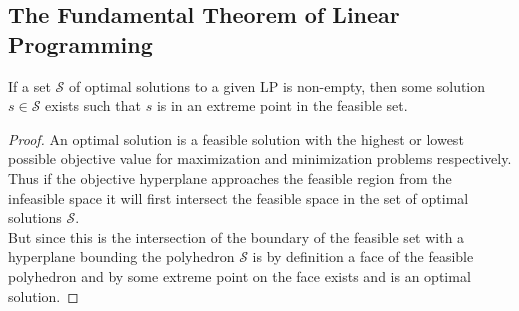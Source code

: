 \subsection{The Fundamental Theorem of Linear Programming}
\begin{theorem}\label{extreme point}
If a set $\mathcal{S}$ of optimal solutions to a given LP is non-empty, then some solution $s\in \mathcal{S}$ exists such that $s$ is in an extreme point in the feasible set.
\begin{proof}
An optimal solution is a feasible solution with the highest or lowest possible objective value for maximization and minimization problems respectively. Thus if the objective hyperplane approaches the feasible region from the infeasible space it will first intersect the feasible space in the set of optimal solutions $\mathcal{S}$.\\
But since this is the intersection of the boundary of the feasible set with a hyperplane bounding the polyhedron $\mathcal{S}$ is by definition a face of the feasible polyhedron and by  some extreme point on the face exists and is an optimal solution. 
\iffalse
Let $A$ be the feasible region to a given Linear problem and let $\textbf{x}_0=\begin{bmatrix}
x_1\\ \vdots\\ x_n
\end{bmatrix}
$ be an optimal solution with value $z(\textbf{x}_0)=\zeta$.
Suppose $\textbf{x}_0$ is not in an extreme point of $A$. Then $\textbf{x}_0$ is either in the open set $A'=A^O$ or on some point of the boundary $\bar{A}-A^O$ that is not an extreme point. In the first case at least one of the coordinates $x_1,\cdots, x_n$ can be increased or decreased until the solution reaches a point $\textbf{x}_1$ on $\bar{A}-A^O$ with $z(\textbf{x}_1)< \text{ or } > \zeta$. Thus that cannot be the case.\\
In the second case there are two options;
\begin{enumerate}
\item The hyperplane defined by $z(\textbf{x}) = \zeta$ intersects one or more of the constraint functions in $\textbf{x}_0$ but is not parallel to any of them.
\item The hyperplane defined by $z(\textbf{x}) = \zeta$ is equal to the entire hyperplane defined by a constraint function or all points of the intersection of several constraint functions are contained within the hyperplane.
\end{enumerate}
In the first case we have a contradiction since we can increase or decrease the values $x_1,\cdots, x_n$ while still remaining in the feasible region and thus find a vector $\textbf{x}_1$ with $z(\textbf{x}_1)< \text{ or } > \zeta$. In the second case the entire subset of the hyperplane contained in the feasible region is optimal and thus the extreme points of that set are also optimal solutions.
\fi
\end{proof}
\end{theorem}
